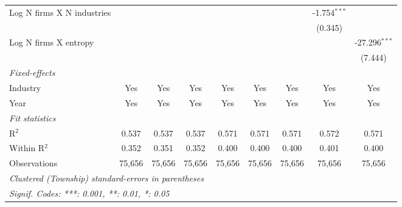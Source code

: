 \begin{tabular}{lcccccccc}
   Log N firms X N industries                            &                 &                 &                 &                  &                  &                  & -1.754$^{***}$   &   \\   
                                                         &                 &                 &                 &                  &                  &                  & (0.345)          &   \\   
   Log N firms X entropy                                 &                 &                 &                 &                  &                  &                  &                  & -27.296$^{***}$\\   
                                                         &                 &                 &                 &                  &                  &                  &                  & (7.444)\\   
   \midrule
   \emph{Fixed-effects}\\
   Industry                                              & Yes             & Yes             & Yes             & Yes              & Yes              & Yes              & Yes              & Yes\\  
   Year                                                  & Yes             & Yes             & Yes             & Yes              & Yes              & Yes              & Yes              & Yes\\  
   \midrule
   \emph{Fit statistics}\\
   R$^2$                                                 & 0.537           & 0.537           & 0.537           & 0.571            & 0.571            & 0.571            & 0.572            & 0.571\\  
   Within R$^2$                                          & 0.352           & 0.351           & 0.352           & 0.400            & 0.400            & 0.400            & 0.401            & 0.400\\  
   Observations                                          & 75,656          & 75,656          & 75,656          & 75,656           & 75,656           & 75,656           & 75,656           & 75,656\\  
   \midrule \midrule
   \multicolumn{9}{l}{\emph{Clustered (Township) standard-errors in parentheses}}\\
   \multicolumn{9}{l}{\emph{Signif. Codes: ***: 0.001, **: 0.01, *: 0.05}}\\
\end{tabular}
\par\endgroup
